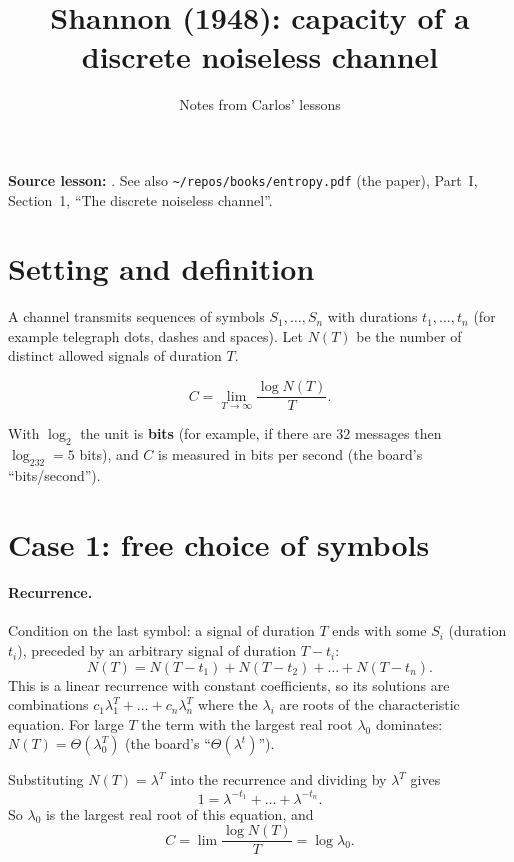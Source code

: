\documentclass[11pt]{article}
\title{Shannon (1948): capacity of a discrete noiseless channel}
\author{Notes from Carlos' lessons}
\date{}
\begin{document}
\maketitle

\textbf{Source lesson:} .
See also \texttt{\textasciitilde/repos/books/entropy.pdf} (the paper), Part~I, Section~1, ``The discrete noiseless channel''.

\section*{Setting and definition}

A channel transmits sequences of symbols $S_1,\dots,S_n$ with durations $t_1,\dots,t_n$ (for example telegraph dots, dashes and spaces). Let $N(T)$ be the number of distinct allowed signals of duration $T$.

\begin{definition}
\[
C=\lim_{T\to\infty}\frac{\log N(T)}{T}.
\]
\end{definition}
With $\log_2$ the unit is \textbf{bits} (for example, if there are $32$ messages then $\log_232=5$ bits), and $C$ is measured in bits per second (the board's ``bits/second'').

\section*{Case 1: free choice of symbols}

\paragraph{Recurrence.} Condition on the last symbol: a signal of duration $T$ ends with some $S_i$ (duration $t_i$), preceded by an arbitrary signal of duration $T-t_i$:
\[
N(T)=N(T-t_1)+N(T-t_2)+\dots+N(T-t_n).
\]
This is a linear recurrence with constant coefficients, so its solutions are combinations $c_1\lambda_1^T+\dots+c_n\lambda_n^T$ where the $\lambda_i$ are roots of the characteristic equation. For large $T$ the term with the largest real root $\lambda_0$ dominates: $N(T)=\Theta(\lambda_0^T)$ (the board's ``$\Theta(\lambda^t)$'').

Substituting $N(T)=\lambda^T$ into the recurrence and dividing by $\lambda^T$ gives
\[
1=\lambda^{-t_1}+\dots+\lambda^{-t_n}.
\]
So $\lambda_0$ is the largest real root of this equation, and
\[
C=\lim\frac{\log N(T)}T=\log\lambda_0.
\]
\end{document}

